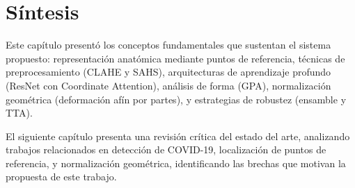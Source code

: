 \section*{Síntesis}

Este capítulo presentó los conceptos fundamentales que sustentan el sistema propuesto: representación anatómica mediante puntos de referencia, técnicas de preprocesamiento (CLAHE y SAHS), arquitecturas de aprendizaje profundo (ResNet con Coordinate Attention), análisis de forma (GPA), normalización geométrica (deformación afín por partes), y estrategias de robustez (ensamble y TTA).

El siguiente capítulo presenta una revisión crítica del estado del arte, analizando trabajos relacionados en detección de COVID-19, localización de puntos de referencia, y normalización geométrica, identificando las brechas que motivan la propuesta de este trabajo.
